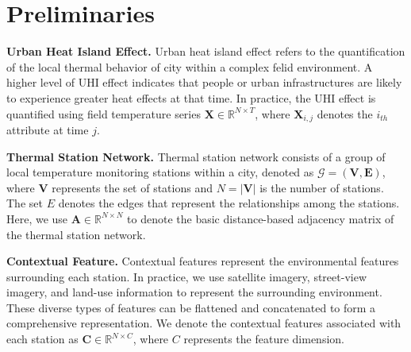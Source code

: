 \section{Preliminaries}
\label{sec:model}

\begin{myDef}
\textbf{Urban Heat Island Effect.} Urban heat island effect refers to the quantification of the local thermal behavior of city within a complex felid environment. A higher level of UHI effect indicates that people or urban infrastructures are likely to experience greater heat effects at that time. In practice, the UHI effect is quantified using field temperature series $\mathbf{X} \in \mathbb{R}^{N \times T}$, where $\mathbf{X}_{i,j}$ denotes the $i_{th}$ attribute at time $j$.
\end{myDef}


\begin{myDef}
\textbf{Thermal Station Network.} Thermal station network consists of a group of local temperature monitoring stations within a city, denoted as $\mathcal{G}=(\mathbf{V},\mathbf{E})$, where $\mathbf{V}$ represents the set of stations and $N =|\mathbf{V}|$ is the number of stations. The set $E$ denotes the edges that represent the relationships among the stations. Here, we use $\mathbf{A} \in \mathbb{R}^{N \times N}$ to denote the basic distance-based adjacency matrix of the thermal station network.
\end{myDef}

\begin{myDef}
\textbf{Contextual Feature.} Contextual features represent the environmental features surrounding each station. In practice, we use satellite imagery, street-view imagery, and land-use information to represent the surrounding environment. These diverse types of features can be flattened and concatenated to form a comprehensive representation. We denote the contextual features associated with each station as $\mathbf{C} \in \mathbb{R}^{N \times C}$, where $C$ represents the feature dimension.
\end{myDef}

